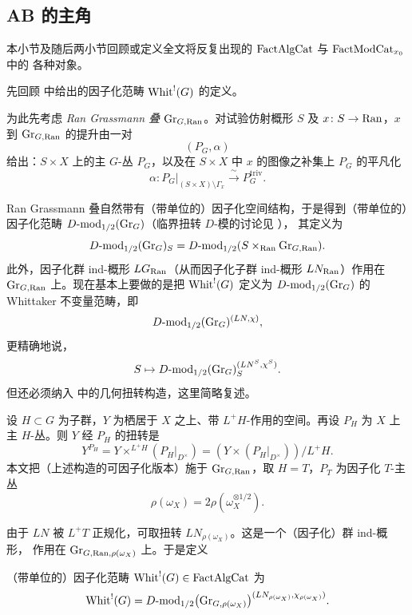 
\subsection{AB 的主角}
\label{sec:ab-characters}

本小节及随后两小节回顾或定义全文将反复出现的 $\mathrm{FactAlgCat}$ 与 $\mathrm{FactModCat}_{x_0}$ 中的
各种对象。

先回顾 \cite[1.3 节]{ABC+24a} 中给出的因子化范畴 $\mathrm{Whit}^{!}(G)$ 的定义。

为此先考虑 \emph{Ran Grassmann 叠} $\mathrm{Gr}_{G,\mathrm{Ran}}$。对试验仿射概形 $S$ 及
$x\colon S\to \mathrm{Ran}$，$x$ 到 $\mathrm{Gr}_{G,\mathrm{Ran}}$ 的提升由一对
\[
(P_G,\alpha)
\]
给出：$S\times X$ 上的主 $G$-丛 $P_G$，以及在 $S\times X$ 中 $x$ 的图像之补集上
$P_G$ 的平凡化
\[
\alpha\colon P_G|_{(S\times X)\setminus \Gamma_x}\xrightarrow{\ \sim\ }P_G^{\mathrm{triv}}.
\]

Ran Grassmann 叠自然带有（带单位的）因子化空间结构，于是得到（带单位的）因子化范畴
$D\text{-}\mathrm{mod}_{1/2}(\mathrm{Gr}_G)$（临界扭转 $D$-模的讨论见 \cite[1.1 节]{ABC+24a}），
其定义为
\[
D\text{-}\mathrm{mod}_{1/2}(\mathrm{Gr}_G)_S
=D\text{-}\mathrm{mod}_{1/2}(S\times_{\mathrm{Ran}}\mathrm{Gr}_{G,\mathrm{Ran}}).
\]
此外，因子化群 ind-概形 $LG_{\mathrm{Ran}}$（从而因子化子群 ind-概形 $LN_{\mathrm{Ran}}$）作用在
$\mathrm{Gr}_{G,\mathrm{Ran}}$ 上。现在基本上要做的是把 $\mathrm{Whit}^{!}(G)$ 定义为
$D\text{-}\mathrm{mod}_{1/2}(\mathrm{Gr}_G)$ 的 Whittaker 不变量范畴，即
\[
D\text{-}\mathrm{mod}_{1/2}(\mathrm{Gr}_G)^{(LN,\chi)},
\]
更精确地说，
\[
S\mapsto D\text{-}\mathrm{mod}_{1/2}(\mathrm{Gr}_G)^{(LN^S,\chi^S)}_S .
\]
但还必须纳入 \cite[1.2 节]{ABC+24a} 中的几何扭转构造，这里简略复述。

设 $H\subset G$ 为子群，$Y$ 为栖居于 $X$ 之上、带 $L^+H$-作用的空间。再设 $P_H$ 为 $X$ 上
主 $H$-丛。则 $Y$ 经 $P_H$ 的扭转是
\[
Y^{P_H}=Y\times^{L^+H}(P_H|_{D^\times})=(Y\times (P_H|_{D^\times}))/L^+H .
\]
本文把（上述构造的可因子化版本）施于 $\mathrm{Gr}_{G,\mathrm{Ran}}$，取 $H=T$，$P_T$ 为因子化
$T$-主丛
\[
\rho(\omega_X)=2\rho(\omega_X^{\otimes 1/2}).
\]

由于 $LN$ 被 $L^+T$ 正规化，可取扭转 $LN_{\rho(\omega_X)}$。这是一个（因子化）群 ind-概形，
作用在 $\mathrm{Gr}_{G,\mathrm{Ran},\rho(\omega_X)}$ 上。于是定义

\begin{definition}
\label{def:whit-G}
（带单位的）因子化范畴 $\mathrm{Whit}^{!}(G)\in \mathrm{FactAlgCat}$ 为
\[
\mathrm{Whit}^{!}(G)
=D\text{-}\mathrm{mod}_{1/2}\bigl(\mathrm{Gr}_{G,\rho(\omega_X)}\bigr)
^{(LN_{\rho(\omega_X)},\chi_{\rho(\omega_X)})}.
\]
\end{definition}

